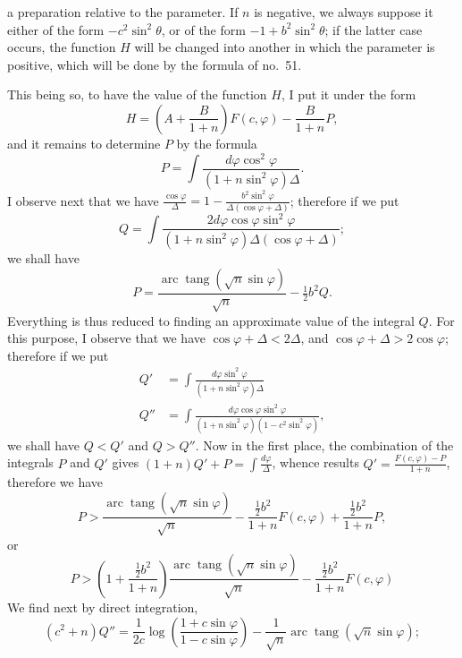 \documentclass{article}
\begin{document}
a preparation relative to the parameter. If $n$ is negative, we always suppose it either of the form $-c^{2}\sin^{2}\theta$, or of the form $-1+b^{2}\sin^{2}\theta$; if the latter case occurs, the function $H$ will be changed into another in which the parameter is positive, which will be done by the formula of no.~51.

This being so, to have the value of the function $H$, I put it under the form
\[ H=\left(A+\frac{B}{1+n}\right)F(c,\varphi)-\frac{B}{1+n}P, \]
and it remains to determine $P$ by the formula
\[ P=\int\frac{d\varphi\cos^{2}\varphi}{(1+n\sin^{2}\varphi)\Delta}. \]
I observe next that we have $\frac{\cos\varphi}{\Delta}=1-\frac{b^{2}\sin^{2}\varphi}{\Delta(\cos\varphi+\Delta)}$; therefore if we put
\[ Q=\int\frac{2d\varphi\cos\varphi\sin^{2}\varphi}{(1+n\sin^{2}\varphi)\Delta(\cos\varphi+\Delta)}; \]
we shall have
\[ P=\frac{\operatorname{arc}\operatorname{tang}(\sqrt{n}\sin\varphi)}{\sqrt{n}}-\tfrac{1}{2}b^{2}Q. \]
Everything is thus reduced to finding an approximate value of the integral $Q$. For this purpose, I observe that we have $\cos\varphi+\Delta<2\Delta$, and $\cos\varphi+\Delta>2\cos\varphi$; therefore if we put
\[ \begin{aligned} Q'&=\int\frac{d\varphi\sin^{2}\varphi}{(1+n\sin^{2}\varphi)\Delta}\\ Q''&=\int\frac{d\varphi\cos\varphi\sin^{2}\varphi}{(1+n\sin^{2}\varphi)(1-c^{2}\sin^{2}\varphi)}, \end{aligned} \]
we shall have $Q<Q'$ and $Q>Q''$. Now in the first place, the combination of the integrals $P$ and $Q'$ gives $(1+n)Q'+P=\displaystyle\int\frac{d\varphi}{\Delta}$, whence results $Q'=\frac{F(c,\varphi)-P}{1+n}$, therefore we have
\[ P>\frac{\operatorname{arc}\operatorname{tang}(\sqrt{n}\sin\varphi)}{\sqrt{n}}-\frac{\tfrac{1}{2}b^{2}}{1+n}F(c,\varphi)+\frac{\tfrac{1}{2}b^{2}}{1+n}P, \]
or
\[ P>\left(1+\frac{\tfrac{1}{2}b^{2}}{1+n}\right)\frac{\operatorname{arc}\operatorname{tang}(\sqrt{n}\sin\varphi)}{\sqrt{n}}-\frac{\tfrac{1}{2}b^{2}}{1+n}F(c,\varphi) \]
We find next by direct integration,
\[ (c^{2}+n)Q''=\frac{1}{2c}\log\left(\frac{1+c\sin\varphi}{1-c\sin\varphi}\right)-\frac{1}{\sqrt{n}}\operatorname{arc}\operatorname{tang}(\sqrt{n}\sin\varphi); \]
\end{document}
